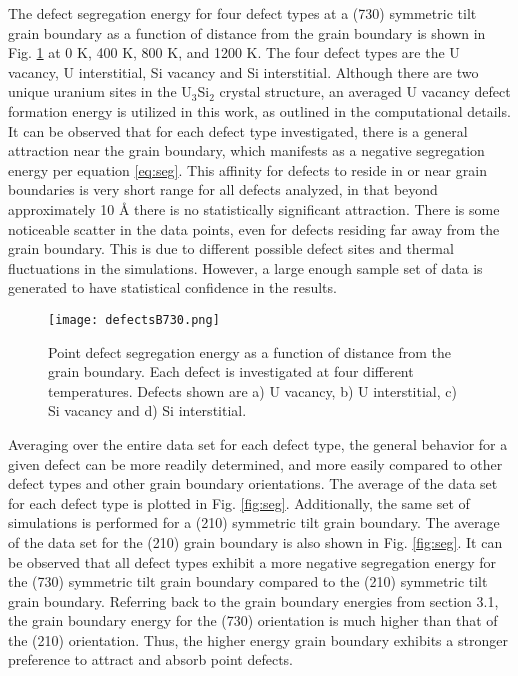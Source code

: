 \documentclass[review]{elsarticle}
\begin{document}
The defect segregation energy for four defect types at a (730) symmetric tilt grain boundary as a function of distance from the grain boundary is shown in Fig. \ref{fig:defects730} at 0 K, 400 K, 800 K, and 1200 K. The four defect types are the U vacancy, U interstitial, Si vacancy and Si interstitial. Although there are two unique uranium sites in the U$_{3}$Si$_{2}$ crystal structure, an averaged U vacancy defect formation energy is utilized in this work, as outlined in the computational details. It can be observed that for each defect type investigated, there is a general attraction near the grain boundary, which manifests as a negative segregation energy per equation \ref{eq:seg}. This affinity for defects to reside in or near grain boundaries is very short range for all defects analyzed, in that beyond approximately 10 {\AA} there is no statistically significant attraction. There is some noticeable scatter in the data points, even for defects residing far away from the grain boundary. This is due to different possible defect sites and thermal fluctuations in the simulations. However, a large enough sample set of data is generated to have statistical confidence in the results.

\begin{figure}[h]
 \centering
 \texttt{[image: defectsB730.png]} 
 \caption{Point defect segregation energy as a function of distance from the grain boundary. Each defect is investigated at four different temperatures. Defects shown are a) U vacancy, b) U interstitial, c) Si vacancy and d) Si interstitial. }
 \label{fig:defects730}
\end{figure}

\begin{comment}

\begin{figure}[h]
 \centering
 \texttt{[image: defectsB210.png]} 
 \caption{Point defect segregation energy as a function of distance from the grain boundary. Each defect is investigated at four different temperatures. Defects shown are U vacancy, U interstitial, Si vacancy and Si interstitial. }
 \label{fig:defects210}
\end{figure}

\end{comment}

Averaging over the entire data set for each defect type, the general behavior for a given defect can be more readily determined, and more easily compared to other defect types and other grain boundary orientations. The average of the data set for each defect type is plotted in Fig. \ref{fig:seg}. Additionally, the same set of simulations is performed for a (210) symmetric tilt grain boundary. The average of the data set for the (210) grain boundary is also shown in Fig. \ref{fig:seg}. It can be observed that all defect types exhibit a more negative segregation energy for the (730) symmetric tilt grain boundary compared to the (210) symmetric tilt grain boundary. Referring back to the grain boundary energies from section 3.1, the grain boundary energy for the (730) orientation is much higher than that of the (210) orientation. Thus, the higher energy grain boundary exhibits a stronger preference to attract and absorb point defects.
\end{document}

